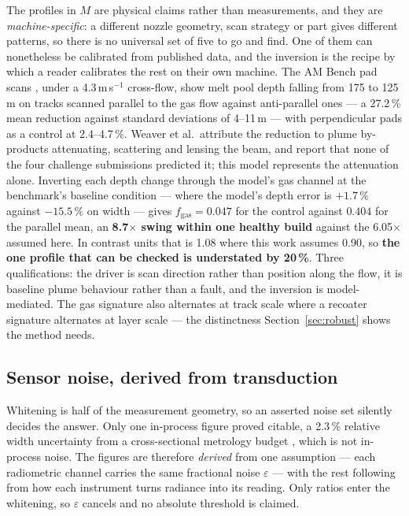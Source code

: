 \documentclass[final,5p,times,twocolumn]{elsarticle}
\begin{document}
The profiles in $M$ are physical claims rather than measurements, and they are
\emph{machine-specific}: a different nozzle geometry, scan strategy or part gives
different patterns, so there is no universal set of five to go and find. One of
them can nonetheless be calibrated from published data, and the inversion is the
recipe by which a reader calibrates the rest on their own machine. The AM Bench pad scans \cite{Weaver2024}, under a 4.3\,m\,s$^{-1}$ cross-flow,
show melt pool depth falling from 175 to 125\,\textmu m on tracks scanned
parallel to the gas flow against anti-parallel ones --- a 27.2\,\% mean
reduction against standard deviations of 4--11\,\textmu m --- with perpendicular pads as a control at 2.4--4.7\,\%. Weaver et al.\ attribute
the reduction to plume by-products attenuating, scattering and lensing the beam,
and report that none of the four challenge submissions predicted it; this model
represents the attenuation alone. Inverting each depth change
through the model's gas channel at the benchmark's baseline condition --- where
the model's depth error is $+1.7$\,\% against $-15.5$\,\% on width --- gives
$f_{\mathrm{gas}}=0.047$ for the control against $0.404$ for the parallel mean,
an \textbf{8.7$\times$ swing within one healthy build} against the 6.05$\times$
assumed here. In contrast units that is 1.08 where this work assumes 0.90, so
\textbf{the one profile that can be checked is understated by 20\,\%}. Three qualifications: the driver is scan direction rather than position along the
flow, it is baseline plume behaviour rather than a fault, and the inversion is
model-mediated. The gas signature also alternates at track scale where a recoater
signature alternates at layer scale --- the distinctness
Section~\ref{sec:robust} shows the method needs.

\subsection{Sensor noise, derived from transduction}
\label{sec:noise}

Whitening is half of the measurement geometry, so an asserted noise set silently
decides the answer. Only one in-process figure proved citable, a 2.3\,\% relative
width uncertainty from a cross-sectional metrology budget \cite{Weaver2024},
which is not in-process noise. The figures are therefore \emph{derived} from one
assumption --- each radiometric channel carries the same fractional noise
$\varepsilon$ --- with the rest following from how each instrument turns radiance
into its reading. Only ratios enter the whitening, so $\varepsilon$ cancels and
no absolute threshold is claimed.
\end{document}
